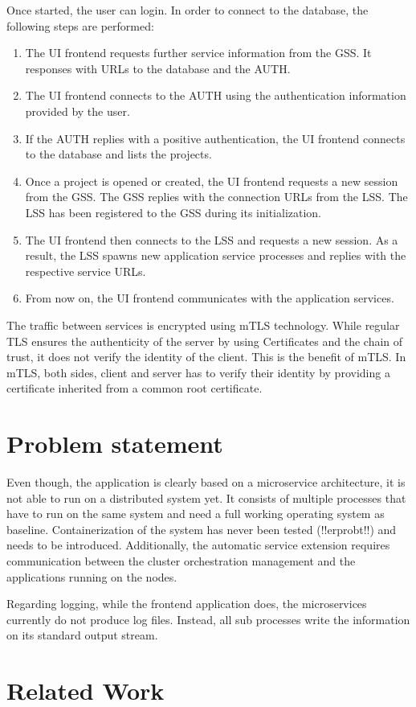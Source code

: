Once started, the user can login. In order to connect to the database, the following steps are performed:
\begin{enumerate}
\item The \ac{UI} frontend requests further service information from the \ac{GSS}. It responses with \acp{URL} to the database and the \ac{AUTH}.
\item The \ac{UI} frontend connects to the \ac{AUTH} using the authentication information provided by the user.
\item If the \ac{AUTH} replies with a positive authentication, the \ac{UI} frontend connects to the database and lists the projects.
\item Once a project is opened or created, the \ac{UI} frontend requests a new session from the \ac{GSS}. The \ac{GSS} replies with the connection \acp{URL} from the \ac{LSS}. The \ac{LSS} has been registered to the \ac{GSS} during its initialization.
\item The \ac{UI} frontend then connects to the \ac{LSS} and requests a new session. As a result, the \ac{LSS} spawns new application service processes and replies with the respective service \acp{URL}.
\item From now on, the \ac{UI} frontend communicates with the application services.
\end{enumerate}

The traffic between services is encrypted using \ac{mTLS} technology. While regular \ac{TLS} ensures the authenticity of the server by using Certificates and the chain of trust, it does not verify the identity of the client. This is the benefit of \ac{mTLS}. In \ac{mTLS}, both sides, client and server has to verify their identity by providing a certificate inherited from a common root certificate.

\section{Problem statement}
Even though, the application is clearly based on a microservice architecture, it is not able to run on a distributed system yet. It consists of multiple processes that have to run on the same system and need a full working operating system as baseline. Containerization of the system has never been tested (!!erprobt!!) and needs to be introduced. 
Additionally, the automatic service extension requires communication between the cluster orchestration management and the applications running on the nodes.

Regarding logging, while the frontend application does, the microservices currently do not produce log files. Instead, all sub processes write the information on its standard output stream.


\section{Related Work}
